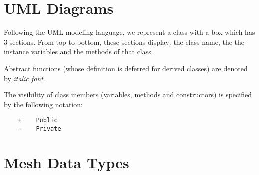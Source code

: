 \documentclass[11pt,article]{article}
\begin{document}

\newcommand{\NV}{NV}
\newcommand{\SD}{SD}

\section{UML Diagrams}

Following the UML modeling language, we represent a class with a box
which has 3 sections. From top to bottom, these sections display: the
class name, the the instance variables and the methods of that class.

Abstract functions (whose definition is deferred for derived classes)
are denoted by \textit{italic font}.

The visibility of class members (variables, methods and constructors)
is specified by the following notation:
\begin{verbatim}
    +    Public
    -    Private
\end{verbatim}

\section{Mesh Data Types}
\end{document}

